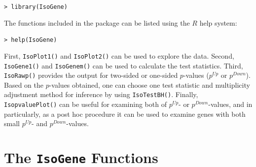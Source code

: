 \begin{center}
\begin{boxit}
\texttt{> library(IsoGene)}
\end{boxit}
\end{center}
The functions included in the package can be listed using the $R$
help system:
\begin{center}
\begin{boxit}
\texttt{> help(IsoGene)}
\end{boxit}
\end{center}





First, \texttt{IsoPlot1()} and \texttt{IsoPlot2()} can be used to
explore the data. Second, \texttt{IsoGene1()} and
\texttt{IsoGenem()} can be used to calculate the test statistics.
Third, \texttt{IsoRawp()} provides the output for two-sided or
one-sided $p$-values ($p^{Up}$ or $p^{Down}$). Based on the
$p$-values obtained, one can choose one test statistic and
multiplicity adjustment method for inference by using
\texttt{IsoTestBH()}. Finally, \texttt{IsopvaluePlot()} can be
useful for examining both of $p^{Up}$- or $p^{Down}$-values, and in
particularly, as a post hoc procedure it can be used to examine
genes with both small $p^{Up}$- and $p^{Down}$-values.


\section{The \texttt{IsoGene} Functions}
